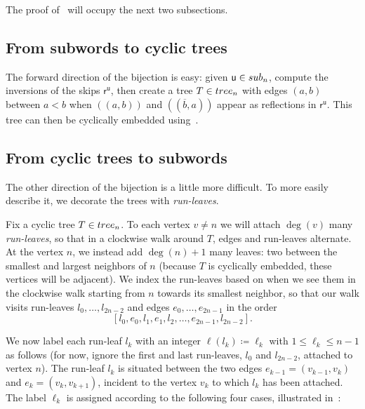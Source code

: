 \documentclass[a4paper,10pt,leqno]{amsart}
\newcommand{\darkred}{\color{darkred}}
\numberwithin{equation}{section}
\theoremstyle{definition}
\theoremstyle{remark}
\renewcommand{\u}{\mathsf{u}}
\newcommand{\T}{\textsc{tree}}
\renewcommand{\S}{\textsc{sub}}
\newcommand{\E}{\T}
\newcommand{\rr}{\mathsf{r}}
\newcommand{\rru}{\rr^\u}
\newcommand{\defn}[1]{\emph{\darkred #1}}
\newcounter{intege}
\begin{document}
The proof of~ will occupy the next two subsections.

\subsection{From subwords to cyclic trees}
The forward direction of the bijection is easy: given $\u \in \S_n$, compute the inversions of the skips $\rru$, then create a tree $T \in \E_n$ with edges $(a,b)$ between $a<b$ when $(\!(a,b)\!)$ and $(\!(\overline{b},a)\!)$ appear as reflections in $\rru$.  This tree can then be cyclically embedded using~.


\subsection{From cyclic trees to subwords}
\label{def:run_leaves}

The other direction of the bijection is a little more difficult.  To more easily describe it, we decorate the trees with \emph{run-leaves}.%

Fix a cyclic tree $T \in \E_n$. %
To each vertex $v \neq n$ we will attach $\deg(v)$ many \defn{run-leaves}, so that in a clockwise walk around $T$, edges and run-leaves alternate.  At the vertex $n$, we instead add $\deg(n) + 1$ many leaves: two between the smallest and largest neighbors of $n$ (because $T$ is cyclically embedded, these vertices will be adjacent).   We index the run-leaves based on when we see them in the clockwise walk starting from $n$ towards its smallest neighbor, so that our walk visits run-leaves $l_0,\ldots,l_{2n-2}$ and edges $e_0,\ldots,e_{2n-1}$ in the order
\begin{equation}
\label{eq:takes_and_skips}
\left[l_0, e_0,l_1,e_1,l_2,\ldots,e_{2n-1},l_{2n-2}\right].
\end{equation}

We now label each run-leaf $l_k$ with an integer $\ell(l_k) \coloneqq \ell_k$ with $1 \leq \ell_k \leq n-1$ as follows (for now, ignore the first and last run-leaves, $l_0$ and $l_{2n-2}$, attached to vertex $n$).  The run-leaf $l_k$ is situated between the two edges $e_{k-1}=(v_{k-1},v_k)$ and $e_k=(v_k,v_{k+1})$, incident to the vertex $v_k$ to which $l_k$ has been attached.  The label $\ell_k$ is assigned according to the following four cases, illustrated in~:
\end{document}

